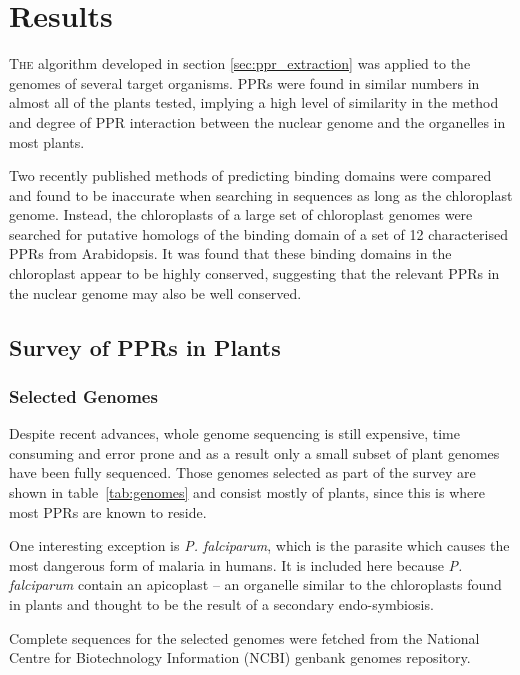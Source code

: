 
\chapter{Results} 
\label{chap:results}

\lettrine{T}{he} 
algorithm developed in section \ref{sec:ppr_extraction} was applied to the
genomes of several target organisms.
PPRs were found in similar numbers in almost all of the plants tested, implying
a high level of similarity in the method and degree of PPR interaction between
the nuclear genome and the organelles in most plants.

Two recently published methods of predicting binding domains were compared and
found to be inaccurate when searching in sequences as long as the chloroplast
genome.
Instead, the chloroplasts of a large set of chloroplast genomes were searched
for putative homologs of the binding domain of a set of 12 characterised PPRs 
from Arabidopsis.
It was found that these binding domains in the chloroplast appear to be highly 
conserved, suggesting that the relevant PPRs in the nuclear genome may also be
well conserved.

\section{Survey of PPRs in Plants}
\label{sec:ppr_survey}

\subsection{Selected Genomes}
\label{sec:survey_genomes}

Despite recent advances, whole genome sequencing is still expensive,
time consuming and error prone and as a result only a small subset of plant
genomes have been fully sequenced.
Those genomes selected as part of the survey are shown in 
table~\ref{tab:genomes} and
consist mostly of plants, since this is where most PPRs are known to reside.

One interesting exception is \emph{P. falciparum}, which is the parasite which
causes the most dangerous form of malaria in humans.
It is included here because \emph{P. falciparum} contain an apicoplast -- 
an organelle similar to the chloroplasts found in plants and thought to be the 
result of a secondary endo-symbiosis. 

Complete sequences for the selected genomes were fetched from the National
Centre for Biotechnology Information (NCBI) genbank genomes repository.

